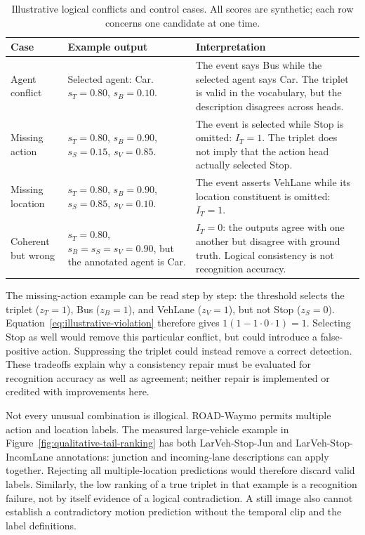 \begin{table}[htbp]
\centering
\caption[Illustrative logical conflicts and control cases.]{Illustrative logical conflicts and control cases. All scores are synthetic; each row concerns one candidate at one time.}
\label{tab:logical-examples}
\begin{singlespace}
\begin{tabularx}{\textwidth}{@{}p{}XX@{}}
\toprule
Case & Example output & Interpretation \\
\midrule
Agent conflict & Selected agent: Car. $s_T=0.80$, $s_B=0.10$. & The event says Bus while the selected agent says Car. The triplet is valid in the vocabulary, but the description disagrees across heads. \\
\addlinespace
Missing action & $s_T=0.80$, $s_B=0.90$, $s_S=0.15$, $s_V=0.85$. & The event is selected while Stop is omitted: $I_T=1$. The triplet does not imply that the action head actually selected Stop. \\
\addlinespace
Missing location & $s_T=0.80$, $s_B=0.90$, $s_S=0.85$, $s_V=0.10$. & The event asserts VehLane while its location constituent is omitted: $I_T=1$. \\
\addlinespace
Coherent but wrong & $s_T=0.80$, $s_B=s_S=s_V=0.90$, but the annotated agent is Car. & $I_T=0$: the outputs agree with one another but disagree with ground truth. Logical consistency is not recognition accuracy. \\
\bottomrule
\end{tabularx}
\end{singlespace}
\end{table}

The missing-action example can be read step by step: the threshold selects the triplet ($z_T=1$), Bus ($z_B=1$), and VehLane ($z_V=1$), but not Stop ($z_S=0$). Equation~\ref{eq:illustrative-violation} therefore gives $1(1-1\cdot0\cdot1)=1$. Selecting Stop as well would remove this particular conflict, but could introduce a false-positive action. Suppressing the triplet could instead remove a correct detection. These tradeoffs explain why a consistency repair must be evaluated for recognition accuracy as well as agreement; neither repair is implemented or credited with improvements here.

Not every unusual combination is illogical. ROAD-Waymo permits multiple action and location labels. The measured large-vehicle example in Figure~\ref{fig:qualitative-tail-ranking} has both LarVeh-Stop-Jun and LarVeh-Stop-IncomLane annotations: junction and incoming-lane descriptions can apply together. Rejecting all multiple-location predictions would therefore discard valid labels. Similarly, the low ranking of a true triplet in that example is a recognition failure, not by itself evidence of a logical contradiction. A still image also cannot establish a contradictory motion prediction without the temporal clip and the label definitions.

